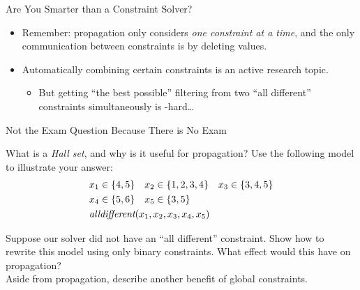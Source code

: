\documentclass[aspectratio=169,compress,10pt]{beamer}
\begin{document}
\begin{frame}{Are You Smarter than a Constraint Solver?}
     {
        \begin{center}\end{center}
    }

     {
        \begin{itemize}
            \item Remember: propagation only considers \emph{one constraint at a time}, and the only
                communication between constraints is by deleting values.

            \item Automatically combining certain constraints is an active research topic.
                \begin{itemize}
                    \item But getting ``the best possible'' filtering from two ``all different''
                        constraints simultaneously is \NP-hard\ldots
                \end{itemize}
        \end{itemize}
    }
\end{frame}

\begin{frame}{Not the Exam Question Because There is No Exam}

    What is a \emph{Hall set}, and why is it useful for propagation? Use the following model to
    illustrate your answer:
    \begin{align*}
        & x_1 \in \{ 4, 5 \}   && x_2 \in \{ 1, 2, 3, 4 \}  && x_3 \in \{ 3, 4, 5 \} \\
        & x_4 \in \{ 5, 6 \}   && x_5 \in \{ 3, 5 \} \\
        & \mathrlap{\textit{alldifferent}( x_1, x_2, x_3, x_4, x_5 )}
    \end{align*}

    Suppose our solver did not have an ``all different'' constraint. Show how to rewrite this model
    using only binary constraints.  What effect would this have on propagation? \\[0.2cm]

    Aside from propagation, describe another benefit of global constraints.

\end{frame}
\end{document}
